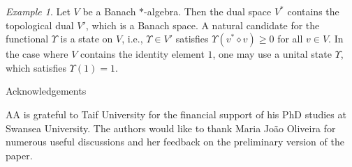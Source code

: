 \documentclass[12pt]{article}
\theoremstyle{remark}
\theoremstyle{remark}
\newtheorem{example}{Example}
\theoremstyle{remark}
\begin{document}
\begin{example} Let $V$ be a Banach $*$-algebra. Then the dual space $V^*$ contains the topological dual $V'$, which is a Banach space. A natural candidate for the functional $\Upsilon$ is a state on $V$, i.e., $\Upsilon\in V'$ satisfies $\Upsilon(v^*\diamond v)\ge0$ for all $v\in V$. In the case where $V$ contains the identity element $1$, one may use a unital state  $\Upsilon$, which satisfies $\Upsilon(1)=1$. 
\end{example}

\begin{center}
Acknowledgements 
\end{center}
AA is grateful to Taif University for the financial support of his PhD studies at Swansea University. 
The authors would like to thank Maria Jo\~{a}o Oliveira for numerous useful discussions and her feedback on the preliminary version of the paper.
\end{document}
